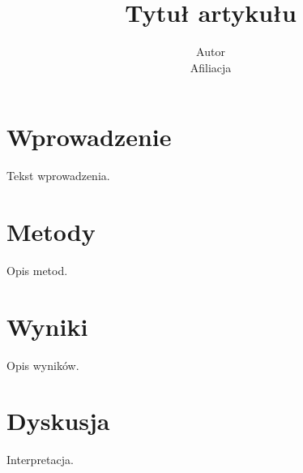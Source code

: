 \documentclass[a4paper,10pt,twocolumn]{article}
\title{Tytuł artykułu}
\author{Autor\\ \small Afiliacja}
\date{}
\begin{document}

\section{Wprowadzenie}
Tekst wprowadzenia.

\section{Metody}
Opis metod.

\section{Wyniki}
Opis wyników.

\section{Dyskusja}
Interpretacja.
\end{document}
